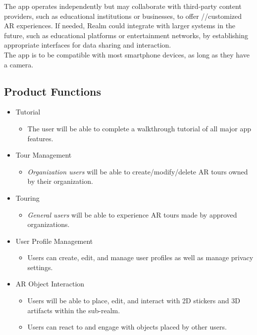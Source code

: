 \documentclass{article}
\begin{document}
The app operates independently but may collaborate with third-party content providers, such as educational institutions or businesses, to offer //customized AR experiences. If needed, Realm could integrate with larger systems in the future, such as educational platforms or entertainment networks, by establishing appropriate interfaces for data sharing and interaction.\\

The app is to be compatible with most smartphone devices, as long as they have a camera.


\subsection{Product Functions}

\begin{itemize}
    \item Tutorial
    \begin{itemize}
        \item The user will be able to complete a walkthrough tutorial of all major app features.
    \end{itemize}

    \item Tour Management
    \begin{itemize}
        \item \textit{Organization users} will be able to create/modify/delete AR tours owned by their organization.
    \end{itemize}

    \item Touring
    \begin{itemize}
        \item \textit{General users} will be able to experience AR tours made by approved organizations.
    \end{itemize}

    \item User Profile Management
    \begin{itemize}
        \item Users can create, edit, and manage user profiles as well as manage privacy settings.
    \end{itemize}

    \item AR Object Interaction
    \begin{itemize}
        \item Users will be able to place, edit, and interact with 2D stickers and 3D artifacts within the sub-realm.
        \item Users can react to and engage with objects placed by other users.
    \end{itemize}


\end{itemize}
\end{document}
